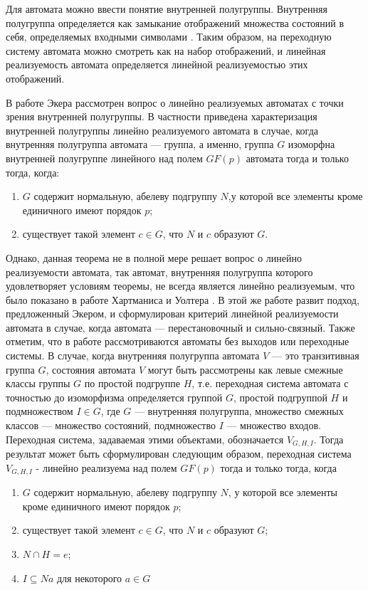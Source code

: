 Для автомата можно ввести понятие внутренней полугруппы.
Внутренняя полугруппа определяется как замыкание отображений
множества состояний в себя, определяемых входными символами
\cite{arbib}. Таким образом, на переходную систему автомата можно
смотреть как на набор отображений, и линейная реализуемость автомата
определяется линейной реализуемостью этих отображений.

В работе Экера \cite{ecker} рассмотрен вопрос о линейно реализуемых автоматах с точки зрения внутренней полугруппы.   
В частности приведена характеризация внутренней полугруппы линейно реализуемого автомата в случае, когда внутренняя полугруппа автомата --- группа, а именно, группа $G$ изоморфна внутренней полугруппе линейного над полем $GF(p)$ автомата тогда и только тогда, когда:
\begin{enumerate}
\item $G$ содержит нормальную, абелеву подгруппу $N$,у которой все элементы кроме единичного имеют порядок $p$;
\item существует такой элемент $c\in G$, что $N$ и $c$ образуют $G$.
\end{enumerate}
Однако, данная теорема не в полной мере решает вопрос о линейно реализуемости автомата, так автомат, внутренняя полугруппа которого удовлетворяет условиям теоремы, не всегда является линейно реализуемым, что было показано в работе Хартманиса и Уолтера \cite{hartmanis_walter}. В этой же работе развит подход, предложенный Экером, и сформулирован критерий линейной реализуемости автомата в случае, когда автомата --- перестановочный и сильно-связный. Также отметим, что в работе рассмотриваются автоматы без выходов или переходные системы. В случае, когда внутренняя полугруппа автомата $V$ --- это транзитивная группа $G$, состояния автомата $V$ могут быть рассмотрены как левые смежные классы группы $G$ по простой подгруппе $H$, т.е. переходная система автомата с точностью до изоморфизма определяется группой $G$, простой подгруппой $H$ и подмножеством $I\in G$, где $G$ --- внутренняя полугруппа, множество смежных классов --- множество состояний, подмножество $I$ --- множество входов. Переходная система, задаваемая этими объектами, обозначается $V_{G,H,I}$. Тогда результат может быть сформулирован следующим образом, переходная система $V_{G,H,I}$ - линейно реализуема над полем $GF(p)$ тогда и только тогда, когда
\begin{enumerate}
\item $G$ содержит нормальную, абелеву подгруппу $N$, у которой все элементы кроме единичного имеют порядок $p$;
\item существует такой элемент $c\in G$, что $N$ и $c$ образуют $G$;
\item $N\cap H={e}$;
\item $I\subseteq Na$ для некоторого $a\in G$
\end{enumerate}
